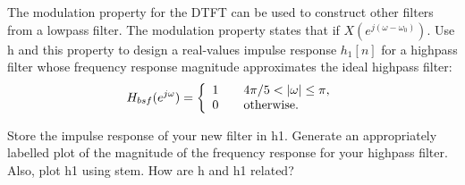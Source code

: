 
The modulation property for the DTFT can be used to construct other filters from a lowpass filter. The modulation property states that if $ X(e^{j(\omega - \omega_0)}) $. Use h and this property to design a real-values impulse response $h_1 [n]$ for a highpass filter whose frequency response magnitude approximates the ideal highpass filter:
\\
\[ H_{bsf}(e^{j \omega}) = \left\{
  \begin{array}{l l}
    1 & \quad \text{$4\pi/5 < |\omega| \le \pi$,} \\
    0 & \quad \text{otherwise.}
  \end{array} \right.\]
  

Store the impulse response of your new filter in h1. Generate an appropriately labelled plot of the magnitude of the frequency response for your highpass filter. Also, plot h1 using stem. How are h and h1 related?
